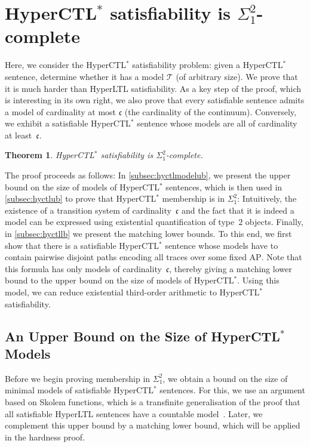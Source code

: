 \documentclass[dvipsnames,10pt,a4paper]{amsart}
\newtheorem{thm}{Theorem}[section]
\theoremstyle{definition}
\theoremstyle{remark}
\newcommand{\contcard}{\cont}
\newcommand{\cont}{\mathfrak{c}}
\newcommand{\tsys}{\mathcal{T}}
\newcommand{\hyltl}{{HyperLTL}\xspace}
\newcommand{\hyctlstar}{{HyperCTL$^*$}\xspace}
\newcommand{\ap}[0]{\mathrm{AP}}
\begin{document}
\section{\texorpdfstring{\hyctlstar}{HyperCTL*} satisfiability is \texorpdfstring{$\Sigma^2_1$}{Sigma21}-complete}
\label{sec:ctlsat}

Here, we consider the \hyctlstar satisfiability problem: given a \hyctlstar sentence, determine whether it has a model $\tsys$ (of arbitrary size). We prove that it is much harder than \hyltl satisfiability.
As a key step of the proof, which is interesting in its own right, we also prove that every satisfiable sentence
admits a model of cardinality at most $\cont$ (the cardinality of the continuum). Conversely, we exhibit
a satisfiable \hyctlstar sentence whose models are all of cardinality at least~$\cont$.

\begin{thm}\label{thm:hyctl-sat}
  \hyctlstar satisfiability is $\Sigma^2_1$-complete.
\end{thm}

The proof proceeds as follows: In \autoref{subsec:hyctlmodelub}, we present the upper bound on the size of models of \hyctlstar sentences, which is then used in \autoref{subsec:hyctlub} to prove that \hyctlstar membership is in $\Sigma^2_1$: Intuitively, the existence of a transition system of cardinality~$\cont$ and the fact that it is indeed a model can be expressed using existential quantification of type~$2$ objects.
Finally, in \autoref{subsec:hyctllb} we present the matching lower bounds.
To this end, we first show that there is a satisfiable \hyctlstar sentence whose models have to contain pairwise disjoint paths encoding all traces over some fixed $\ap$. Note that this formula has only models of cardinality~$\contcard$, thereby giving a matching lower bound to the upper bound on the size of models of \hyctlstar.
Using this model, we can reduce existential third-order arithmetic to \hyctlstar satisfiability.

\subsection{An Upper Bound on the Size of \texorpdfstring{\hyctlstar}{HyperCTL*} Models}
\label{subsec:hyctlmodelub}
Before we begin proving membership in $\Sigma^2_1$, we obtain a bound on the size of minimal models of satisfiable \hyctlstar sentences. For this, we use an argument based on Skolem functions, which is a transfinite generalisation of the proof that all satisfiable \hyltl sentences have a countable model~\cite{FZ17}.
Later, we complement this upper bound by a matching lower bound, which will be applied in the hardness proof.
\end{document}
